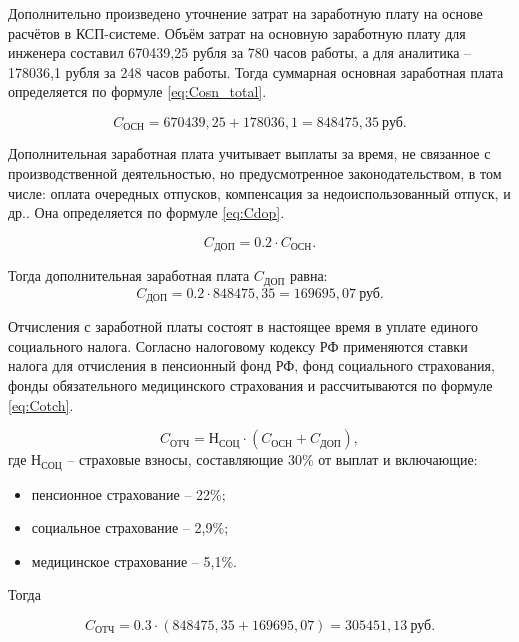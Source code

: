 Дополнительно произведено уточнение затрат на заработную плату на основе расчётов в КСП-системе. Объём затрат на основную заработную плату для инженера составил 670439{,}25 рубля за 780 часов работы, а для аналитика -- 178036{,}1 рубля за 248 часов работы. Тогда суммарная основная заработная плата определяется по формуле \eqref{eq:Cosn_total}.

\begin{equation}\label{eq:Cosn_total}
C_{\text{ОСН}} = 670439{,}25 + 178036{,}1 = 848475{,}35 \ \text{руб.}
\end{equation}

Дополнительная заработная плата учитывает выплаты за время, не связанное с производственной деятельностью, но предусмотренное законодательством,  в том числе: оплата очередных отпусков, компенсация за недоиспользованный отпуск, и др.. Она определяется по формуле \eqref{eq:Cdop}.

\begin{equation}\label{eq:Cdop}
C_{\text{ДОП}} = 0.2 \cdot C_{\text{ОСН}}.
\end{equation}

Тогда дополнительная заработная плата $C_{\text{ДОП}}$ равна:
$$
C_{\text{ДОП}} = 0.2 \cdot 848475{,}35 = 169695{,}07 \ \text{руб.}
$$

Отчисления с заработной платы состоят в настоящее время в уплате единого социального налога. Согласно налоговому кодексу РФ применяются ставки налога для отчисления в пенсионный фонд РФ, фонд социального страхования, фонды обязательного медицинского страхования и рассчитываются по формуле \eqref{eq:Cotch}.

\begin{equation}\label{eq:Cotch}
C_{\text{ОТЧ}} = \text{Н}_{\text{СОЦ}} \cdot (C_{\text{ОСН}} + C_{\text{ДОП}}),
\end{equation}
где $\text{Н}_{\text{СОЦ}}$ -- страховые взносы, составляющие 30\% от выплат и включающие:

\begin{itemize}
    \item пенсионное страхование -- 22\%;
    \item социальное страхование -- 2{,}9\%;
    \item медицинское страхование -- 5{,}1\%.
\end{itemize}

Тогда

$$
C_{\text{ОТЧ}} = 0.3 \cdot (848475{,}35 + 169695{,}07) = 305451{,}13 \ \text{руб.}
$$

